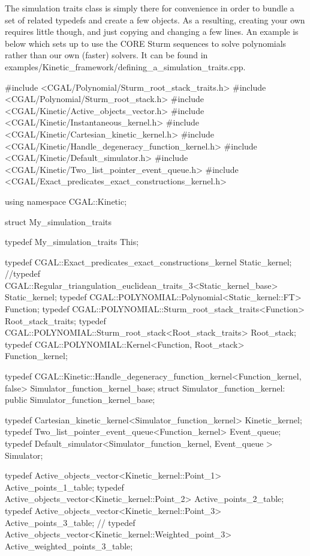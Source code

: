 \ccExample

The simulation traits class is simply there for convenience in order to bundle a set of related typedefs and create a few objects. As a resulting, creating your own requires little though, and just copying and changing a few lines. An example is below which sets up to use the CORE Sturm sequences to solve polynomials rather than our own (faster) solvers. It can be found in examples/Kinetic\_framework/defining\_a\_simulation\_traits.cpp.

\begin{ccExampleCode}

#include <CGAL/Polynomial/Sturm_root_stack_traits.h>
#include <CGAL/Polynomial/Sturm_root_stack.h>
#include <CGAL/Kinetic/Active_objects_vector.h>
#include <CGAL/Kinetic/Instantaneous_kernel.h>
#include <CGAL/Kinetic/Cartesian_kinetic_kernel.h>
#include <CGAL/Kinetic/Handle_degeneracy_function_kernel.h>
#include <CGAL/Kinetic/Default_simulator.h>
#include <CGAL/Kinetic/Two_list_pointer_event_queue.h>
#include <CGAL/Exact_predicates_exact_constructions_kernel.h>

using namespace CGAL::Kinetic;

struct My_simulation_traits {
  typedef My_simulation_traits This;

  typedef CGAL::Exact_predicates_exact_constructions_kernel Static_kernel;
  //typedef CGAL::Regular_triangulation_euclidean_traits_3<Static_kernel_base> Static_kernel;
  typedef CGAL::POLYNOMIAL::Polynomial<Static_kernel::FT> Function;
  typedef CGAL::POLYNOMIAL::Sturm_root_stack_traits<Function> Root_stack_traits;
  typedef CGAL::POLYNOMIAL::Sturm_root_stack<Root_stack_traits> Root_stack;
  typedef CGAL::POLYNOMIAL::Kernel<Function, Root_stack> Function_kernel;

  typedef CGAL::Kinetic::Handle_degeneracy_function_kernel<Function_kernel, false>  Simulator_function_kernel_base;
  struct Simulator_function_kernel: public Simulator_function_kernel_base{};

  typedef Cartesian_kinetic_kernel<Simulator_function_kernel> Kinetic_kernel;
  typedef Two_list_pointer_event_queue<Function_kernel> Event_queue;
  typedef Default_simulator<Simulator_function_kernel, Event_queue > Simulator;

  typedef Active_objects_vector<Kinetic_kernel::Point_1> Active_points_1_table;
  typedef Active_objects_vector<Kinetic_kernel::Point_2> Active_points_2_table;
  typedef Active_objects_vector<Kinetic_kernel::Point_3> Active_points_3_table;
  // typedef Active_objects_vector<Kinetic_kernel::Weighted_point_3> Active_weighted_points_3_table;
 
}
\end{ccExampleCode}
